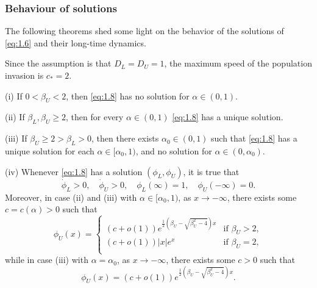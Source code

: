 \begin{frame}[allowframebreaks]
    \frametitle{Behaviour of solutions}
    The following theorems shed some light on the behavior of the solutions of \eqref{eq:1.6} and their long-time dynamics.
    \begin{theorem}
        Since the assumption is that \(D_L = D_U = 1\), the maximum speed of the population invasion is \(c_* = 2\). 
        
        (i) If \(0 < \beta_U < 2\), then \eqref{eq:1.8} has no solution for \(\alpha \in (0, 1)\). 


        (ii) If \(\beta_L, \beta_U \geq 2\), then for every \(\alpha \in (0, 1)\) \eqref{eq:1.8} has a unique solution.


        (iii) If \(\beta_U \geq 2 > \beta_L > 0\), then there exists \(\alpha_0 \in (0, 1)\) such that \eqref{eq:1.8} has a unique solution for each \(\alpha \in [\alpha_0, 1)\), and no solution for \(\alpha \in (0, \alpha_0)\).

        \theorembreak
        (iv)  Whenever \eqref{eq:1.8} has a solution \((\phi_L, \phi_U)\), it is true that 
            \[
                \dot{\phi}_L > 0, \quad \dot{\phi}_U > 0, \quad \phi_L(\infty) = 1, \quad \phi_U(-\infty) = 0.
            \]
            Moreover, in case (ii) and (iii) with \(\alpha \in [\alpha_0, 1)\), as \(x \to -\infty\), there exists some \(c = c(\alpha) > 0\) such that
            \begin{equation}
                \phi_U(x) = \begin{cases}
                    (c + o(1))e^{\frac{1}{2}(\beta_U - \sqrt{\beta_U^2 - 4})x} & \text{if } \beta_U > 2, \\
                    (c + o(1))\lvert x\rvert e^{x} & \text{if } \beta_U = 2, \\
                \end{cases} 
                \label{eq:1.9}
            \end{equation}
        \theorembreak
            while in case (iii) with \(\alpha = \alpha_0\), as \(x \to -\infty\), there exists some \(c > 0\) such that
            \begin{equation}
                \phi_U(x) = (c + o(1))e^{\frac{1}{2}(\beta_U - \sqrt{\beta_U^2 - 4})x}.
                \label{eq:1.10}
            \end{equation}
        \label{thm:1.1}
    \end{theorem}
\end{frame}

